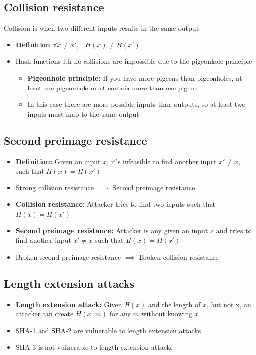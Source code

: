 \documentclass[12pt,a4paper]{article}
\begin{document}
\subsection{Collision resistance}
Collision is when two different inputs results in the same output
\begin{itemize}
    \item \textbf{Definition} $\forall x \neq x', \hspace{10pt} H(x) \neq H(x')$
    \item Hash functions ith no collisions are impossible due to the pigeonhole principle
    \begin{itemize}
        \item \textbf{Pigeonhole principle:} If you have more pigeons than pigeonholes, at least one pigeonhole must contain more than one pigeon
        \item In this case there are more possible inputs than outputs, so at least two inputs must map to the same output
    \end{itemize}
\end{itemize}

\subsection{Second preimage resistance}
\begin{itemize}
    \item \textbf{Definition:} Given an input $x$, it's infeasible to find another input $x' \neq x$, such that $H(x) = H(x')$
    \item Strong collision resistance $\implies$ Second preimage resistance
    \item \textbf{Collision resistance: } Attacker tries to find two inputs such that $H(x) = H(x')$
    \item \textbf{Second preimage resistance: } Attacker is any given an input $x$ and tries to find another input $x' \neq x$ such that $H(x) = H(x')$
    \item Broken second preimage resistance $\implies$ Broken collision resistance
\end{itemize}

\subsection{Length extension attacks}
\begin{itemize}
    \item \textbf{Length extension attack:} Given $H(x)$ and the length of $x$, but not x, an attacker can create $H(x || m)$ for any $m$ without knowing $x$
    \item SHA-1 and SHA-2 are vulnerable to length extension attacks
    \item SHA-3 is not vulnerable to length extension attacks
\end{itemize}
\end{document}
